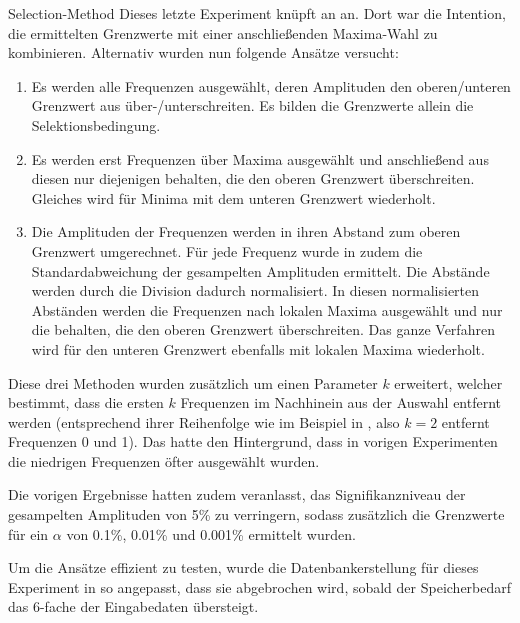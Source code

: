     \begin{experiment}{Selection-Method} %
        \label{exp:selection_method}
        Dieses letzte Experiment knüpft an  an. Dort war die Intention, die ermittelten Grenzwerte mit einer anschließenden Maxima-Wahl zu kombinieren. Alternativ wurden nun folgende Ansätze versucht:
    
        \begin{enumerate}
            \item Es werden alle Frequenzen ausgewählt, deren Amplituden den oberen/unteren Grenzwert aus  über-/unterschreiten. Es bilden die Grenzwerte allein die Selektionsbedingung.
            \item Es werden erst Frequenzen über Maxima ausgewählt und anschließend aus diesen nur diejenigen behalten, die den oberen Grenzwert überschreiten. Gleiches wird für Minima mit dem unteren Grenzwert wiederholt.
            \item Die Amplituden der Frequenzen werden in ihren Abstand zum oberen Grenzwert umgerechnet. Für jede Frequenz wurde in  zudem die Standardabweichung der gesampelten Amplituden ermittelt. Die Abstände werden durch die Division dadurch normalisiert. In diesen normalisierten Abständen werden die Frequenzen nach lokalen Maxima ausgewählt und nur die behalten, die den oberen Grenzwert überschreiten. Das ganze Verfahren wird für den unteren Grenzwert ebenfalls mit lokalen Maxima wiederholt.
        \end{enumerate}

        Diese drei Methoden wurden zusätzlich um einen Parameter $k$ erweitert, welcher bestimmt, dass die ersten $k$ Frequenzen im Nachhinein aus der Auswahl entfernt werden (entsprechend ihrer Reihenfolge wie im Beispiel in , also $k=2$ entfernt Frequenzen 0 und 1). Das hatte den Hintergrund, dass in vorigen Experimenten die niedrigen Frequenzen öfter ausgewählt wurden.

        Die vorigen Ergebnisse hatten zudem veranlasst, das Signifikanzniveau der gesampelten Amplituden von 5\% zu verringern, sodass zusätzlich die Grenzwerte für ein $\alpha$ von 0.1\%, 0.01\% und 0.001\% ermittelt wurden.

        Um die Ansätze effizient zu testen, wurde die Datenbankerstellung für dieses Experiment in  so angepasst, dass sie abgebrochen wird, sobald der Speicherbedarf das 6-fache der Eingabedaten übersteigt.
    \end{experiment}
